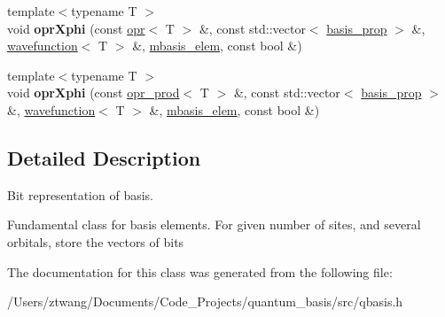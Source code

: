 \begin{DoxyCompactItemize}
\item 
\mbox{\label{classqbasis_1_1mbasis__elem_a29c6eee40d4c70b5acfb5c34203497df}} 
{\footnotesize template$<$typename T $>$ }\\void {\bfseries opr\+Xphi} (const \hyperlink{classqbasis_1_1opr}{opr}$<$ T $>$ \&, const std\+::vector$<$ \hyperlink{classqbasis_1_1basis__prop}{basis\+\_\+prop} $>$ \&, \hyperlink{classqbasis_1_1wavefunction}{wavefunction}$<$ T $>$ \&, \hyperlink{classqbasis_1_1mbasis__elem}{mbasis\+\_\+elem}, const bool \&)
\item 
\mbox{\label{classqbasis_1_1mbasis__elem_ace9e7f240f7e4f1d4ff4e328ef90dd21}} 
{\footnotesize template$<$typename T $>$ }\\void {\bfseries opr\+Xphi} (const \hyperlink{classqbasis_1_1opr__prod}{opr\+\_\+prod}$<$ T $>$ \&, const std\+::vector$<$ \hyperlink{classqbasis_1_1basis__prop}{basis\+\_\+prop} $>$ \&, \hyperlink{classqbasis_1_1wavefunction}{wavefunction}$<$ T $>$ \&, \hyperlink{classqbasis_1_1mbasis__elem}{mbasis\+\_\+elem}, const bool \&)
\end{DoxyCompactItemize}


\subsection{Detailed Description}
Bit representation of basis. 

Fundamental class for basis elements. For given number of sites, and several orbitals, store the vectors of bits 

The documentation for this class was generated from the following file\+:\begin{DoxyCompactItemize}
\item 
/\+Users/ztwang/\+Documents/\+Code\+\_\+\+Projects/quantum\+\_\+basis/src/qbasis.\+h\end{DoxyCompactItemize}
